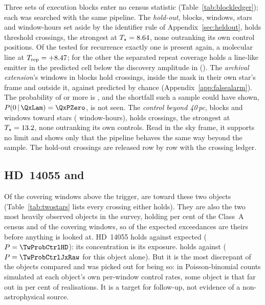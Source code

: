 Three sets of execution blocks enter no census statistic
(Table~\ref{tab:blockledger}); each was searched with the same pipeline. The \emph{hold-out}, \HoNBlock{} blocks,
\HoNWin{} windows, \HoNStar{} stars and \HoHours{} window-hours set aside by the
identifier rule of Appendix~\ref{sec:heldout}, holds \HoNCross{} threshold
crossings, the strongest at $T_\star=8.64$, none outranking its own control
positions. Of the \HoNTested{} tested for recurrence exactly one is present
again, a molecular line at $T_{\rm rep}=+8.47$; for the other
\HoNNonRec{} the separated repeat coverage holds a line-like emitter in the
predicted cell below the discovery amplitude in \HoNFracBelowWord{}
(\HoFracMin). The
\emph{archival extension}'s \LdgExtWin{} windows in \LdgExtEB{} blocks hold
\QxObsCross{} crossings, \QxObsAttr{} inside the mask in their own star's frame
and \QxObsUnattr{} outside it, against \QxLam{} predicted by chance
(Appendix~\ref{app:falsealarm}). The probability of \QxObsUnattr{} or more is
\QxPGe, and the shortfall such a sample could have shown,
$P(0\,|\,\QxLam)=\QxPZero$, is not seen. The
\emph{control beyond 40\,pc}, \OosNBlock{} blocks and \OosNWin{} windows toward
\OosNStar{} stars (\OosHours{} window-hours), holds \OosNCross{} crossings, the
strongest at $T_\star=13.2$, none outranking its own controls. Read in the sky frame, it supports no limit and shows only that the pipeline behaves the
same way beyond the sample. The hold-out crossings are released row by row
with the crossing ledger.

\subsection{HD~14055 and \BkAlmaName}
\label{sec:twostars}

Of the \WuNWinExc{} covering windows above the trigger, \TwNWinExcTwoWord{}
are toward these two objects (Table~\ref{tab:twostars} lists every crossing
either holds). They are also the two most heavily observed objects in the
survey, holding \TwWinASharePct{} per cent of the Class~A census and
\TwNWinTwo{} of the \WuNWin{} covering windows, so \TwExpTwoCtrl{} of the
\WuExpWinCtrl{} expected exceedances are theirs before anything is looked at. HD~14055 holds \TwNExcHD{} against
\TwExpCtrlHD{} expected ($P=\TwProbCtrlHD$): its concentration is its exposure. \BkAlmaName{} holds
\TwNExcJx{} against \TwExpCtrlJx{} ($P=\TwProbCtrlJxRaw$ for this object alone). But it is the most discrepant of the
\TwLookNStarCtrl{} objects compared and was picked out for being so: in
Poisson-binomial counts simulated at each object's own per-window control
rates, some object is that far out in \TwLookPctCtrl{} per cent of
realisations. It is a
target for follow-up, not evidence of a non-astrophysical source.

